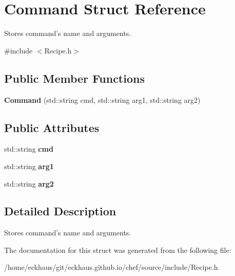 \hypertarget{structCommand}{\section{Command Struct Reference}
\label{structCommand}
}


Stores command's name and arguments.  




{\ttfamily \#include $<$Recipe.\-h$>$}

\subsection*{Public Member Functions}
\begin{DoxyCompactItemize}
\item 
\hypertarget{structCommand_a8c17718094dcdd72c22876280e2c6186}{{\bfseries Command} (std\-::string cmd, std\-::string arg1, std\-::string arg2)}\label{structCommand_a8c17718094dcdd72c22876280e2c6186}

\end{DoxyCompactItemize}
\subsection*{Public Attributes}
\begin{DoxyCompactItemize}
\item 
\hypertarget{structCommand_a813720d74fc874f645317952e64912c1}{std\-::string {\bfseries cmd}}\label{structCommand_a813720d74fc874f645317952e64912c1}

\item 
\hypertarget{structCommand_a88d74a2b093fbe641063cf2372034fef}{std\-::string {\bfseries arg1}}\label{structCommand_a88d74a2b093fbe641063cf2372034fef}

\item 
\hypertarget{structCommand_a76d912f679dcda645a56e0e8ffe765cf}{std\-::string {\bfseries arg2}}\label{structCommand_a76d912f679dcda645a56e0e8ffe765cf}

\end{DoxyCompactItemize}


\subsection{Detailed Description}
Stores command's name and arguments. 

The documentation for this struct was generated from the following file\-:\begin{DoxyCompactItemize}
\item 
/home/eckhaus/git/eckhaus.\-github.\-io/chef/source/include/Recipe.\-h\end{DoxyCompactItemize}

